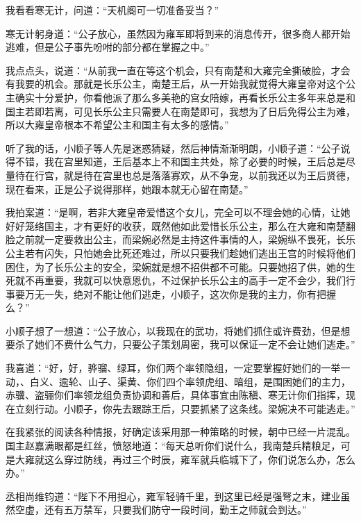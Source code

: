 我看看寒无计，问道：“天机阁可一切准备妥当？”

寒无计躬身道：“公子放心，虽然因为雍军即将到来的消息传开，很多商人都开始逃难，但是公子事先吩咐的部分都在掌握之中。”

我点点头，说道：“从前我一直在等这个机会，只有南楚和大雍完全撕破脸，才会有我要的机会。那就是长乐公主，南楚王后，从一开始我就觉得大雍皇帝对这个公主确实十分爱护，你看他派了那么多美艳的宫女陪嫁，再看长乐公主多年来总是和国主若即若离，可见长乐公主只需要人在南楚即可，我想为了日后免得公主为难，所以大雍皇帝根本不希望公主和国主有太多的感情。”

听了我的话，小顺子等人先是迷惑猜疑，然后神情渐渐明朗，小顺子道：“公子说得不错，我在宫里知道，王后基本上不和国主共处，除了必要的时候，王后总是尽量待在行宫，就是待在宫里也总是落落寡欢，从不争宠，以前我还以为王后贤德，现在看来，正是公子说得那样，她跟本就无心留在南楚。”

我拍案道：“是啊，若非大雍皇帝爱惜这个女儿，完全可以不理会她的心情，让她好好笼络国主，才有更好的收获，既然他如此爱惜长乐公主，那么在大雍和南楚翻脸之前就一定要救出公主，而梁婉必然是主持这件事情的人，梁婉纵不畏死，长乐公主若有闪失，只怕她会比死还难过，所以只要我们趁她们逃出王宫的时候将他们困住，为了长乐公主的安全，梁婉就是想不招供都不可能。只要她招了供，她的生死就不再重要，我就可以快意恩仇，不过保护长乐公主的高手一定不会少，我们行事要万无一失，绝对不能让他们逃走，小顺子，这次你是我的主力，你有把握么？”

小顺子想了一想道：“公子放心，以我现在的武功，将她们抓住或许费劲，但是想要杀了她们不费什么气力，只要公子策划周密，我可以保证一定不会让她们逃走。”

我喜道：“好，好，骅骝、绿耳，你们两个率领隐组，一定要掌握好她们的一举一动，、白义、逾轮、山子、渠黄、你们四个率领虎组、暗组，是围困她们的主力，赤骥、盗骊你们率领龙组负责协调和善后，具体事宜由陈稹、寒无计你们指挥，现在立刻行动。小顺子，你先去跟踪王后，只要抓紧了这条线。梁婉决不可能逃走。”

在我紧张的阅读各种情报，好确定该采用那一种策略的时候，朝中已经一片混乱。国主赵嘉满眼都是红丝，愤怒地道：“每天总听你们说什么，我南楚兵精粮足，可是大雍就这么穿过防线，再过三个时辰，雍军就兵临城下了，你们说怎么办，怎么办。”

丞相尚维钧道：“陛下不用担心，雍军轻骑千里，到这里已经是强弩之末，建业虽然空虚，还有五万禁军，只要我们防守一段时间，勤王之师就会到达。”


